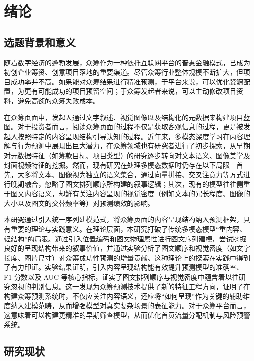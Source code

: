\newpage
\setcounter{table}{0}
\setcounter{figure}{0}
\section{绪论}

\subsection{选题背景和意义}

随着数字经济的蓬勃发展，众筹作为一种依托互联网平台的普惠金融模式，已成为初创企业筹资、创意项目落地的重要渠道。尽管众筹行业整体规模不断扩大，但项目成功率并不高。如果能对众筹结果进行精准预测，于平台来说，可以优化资源配置，为更有可能成功的项目预留空间；于众筹发起者来说，可以主动修改项目资料，避免高额的众筹失败成本。

在众筹页面中，发起人通过文字叙述、视觉图像以及结构化的元数据来构建项目蓝图。对于投资者而言，阅读众筹页面的过程不仅是获取客观信息的过程，更是被发起人按照特定的内容呈现结构引导认知的过程。近年来，多模态深度学习在内容理解与行为预测中展现出巨大潜力，在众筹领域也有研究者进行了初步探索，从早期对元数据特征（如筹款目标、项目类型）的研究逐步转向对文本语义、图像美学及封面视频特征的挖掘。然而，现有研究在处理多模态数据时仍存在以下局限：首先，大多将文本、图像视为独立的语义集合，通过向量拼接、交叉注意力等方式进行晚期融合，忽略了图文排列顺序所构建的叙事逻辑；其次，现有的模型往往侧重于图文内容语义，却鲜有关注内容呈现的视觉密度（例如文本的冗长程度、图像的大小以及图文的交替频率等）对预测绩效的影响。

本研究通过引入统一序列建模范式，将众筹页面的内容呈现结构纳入预测框架，具有重要的理论与实践意义。在理论层面，本研究打破了传统多模态模型``重内容、轻结构''的局限。通过引入位置编码和图文物理属性进行图文序列建模，尝试挖掘良好的呈现结构带来的叙事价值，并通过实验分析了图文顺序和视觉密度（如文字长度、图片尺寸）对众筹成功性预测的增量贡献。这种理论上的探索在实践中得到了有力印证。实验结果证明，引入内容呈现结构能有效提升预测模型的准确率、F1 分数以及 AUC 等核心指标，证实了图文排列顺序与视觉密度中蕴含着以往研究忽视的判别信息。这一发现为众筹预测技术提供了新的特征工程方向，证明了在构建众筹预测系统时，不仅应关注内容语义，还应将``如何呈现''作为关键的辅助维度纳入建模范畴，从而增强模型对真实复杂场景的表征能力。对于众筹平台而言，这意味着可以构建更精准的早期筛查模型，从而优化首页流量分配机制与风险预警系统。

\subsection{研究现状}

